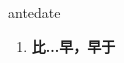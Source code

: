 
\begin{frame}
{\huge antedate}
\begin{center}
\begin{enumerate}\Large
  \item \textbf{比...早，早于}
\end{enumerate}
\end{center}
\end{frame}
